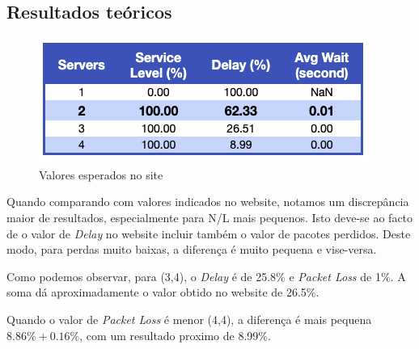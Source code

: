 \subsection*{Resultados teóricos}

\begin{figure}[H]
    \centering
    \includegraphics[width=.5\linewidth]{figs/image_7.png}
    \caption{Valores esperados no site}
    \label{fig:7}
\end{figure}

Quando comparando com valores indicados no website, notamos um discrepância maior de resultados, especialmente para N/L mais pequenos.
Isto deve-se ao facto de o valor de \textit{Delay} no website incluir também o valor de pacotes perdidos.
Deste modo, para perdas muito baixas, a diferença é muito pequena e vise-versa.

Como podemos observar, para (3,4), o \textit{Delay} é de 25.8\% e \textit{Packet Loss} de 1\%.
A soma dá aproximadamente o valor obtido no website de 26.5\%.

Quando o valor de \textit{Packet Loss} é menor (4,4), a diferença é mais pequena $8.86\% + 0.16\%$, com um resultado proximo de 8.99\%.
